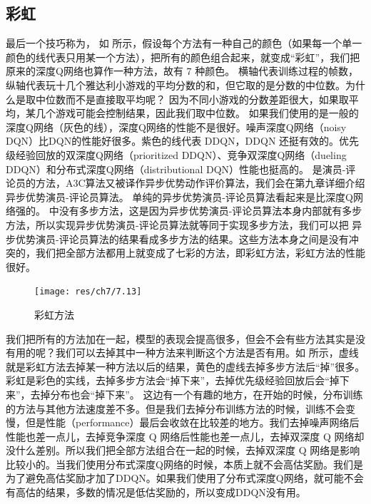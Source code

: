 \subsection{彩虹} 

最后一个技巧称为，
如 所示，假设每个方法有一种自己的颜色（如果每一个单一颜色的线代表只用某一个方法），把所有的颜色组合起来，就变成“彩虹”，我们把原来的深度Q网络也算作一种方法，故有 7 种颜色。
横轴代表训练过程的帧数，纵轴代表玩十几个雅达利小游戏的平均分数的和，但它取的是分数的中位数。为什么是取中位数而不是直接取平均呢？
因为不同小游戏的分数差距很大，如果取平均，某几个游戏可能会控制结果，因此我们取中位数。
如果我们使用的是一般的深度Q网络（灰色的线），深度Q网络的性能不是很好。噪声深度Q网络（noisy DQN）比DQN的性能好很多。紫色的线代表 DDQN，DDQN 还挺有效的。优先级经验回放的双深度Q网络（prioritized DDQN）、竞争双深度Q网络（dueling DDQN）和分布式深度Q网络（distributional DQN）性能也挺高的。
是演员-评论员的方法，A3C算法又被译作异步优势动作评价算法，我们会在第九章详细介绍异步优势演员-评论员算法。
单纯的异步优势演员-评论员算法看起来是比深度Q网络强的。 中没有多步方法，这是因为异步优势演员-评论员算法本身内部就有多步方法，所以实现异步优势演员-评论员算法就等同于实现多步方法，我们可以把 异步优势演员-评论员算法的结果看成多步方法的结果。这些方法本身之间是没有冲突的，我们把全部方法都用上就变成了七彩的方法，即彩虹方法，彩虹方法的性能很好。

\begin{figure}[htb]
    \centering
    \texttt{[image: res/ch7/7.13]}
    \caption{彩虹方法}
    \label{fig:rainbow}
\end{figure}

我们把所有的方法加在一起，模型的表现会提高很多，但会不会有些方法其实是没有用的呢？我们可以去掉其中一种方法来判断这个方法是否有用。如 所示，虚线就是彩虹方法去掉某一种方法以后的结果，黄色的虚线去掉多步方法后“掉”很多。彩虹是彩色的实线，去掉多步方法会“掉下来”，去掉优先级经验回放后会“掉下来”，去掉分布也会“掉下来”。
这边有一个有趣的地方，在开始的时候，分布训练的方法与其他方法速度差不多。但是我们去掉分布训练方法的时候，训练不会变慢，但是性能（performance）最后会收敛在比较差的地方。我们去掉噪声网络后性能也差一点儿，去掉竞争深度 Q 网络后性能也差一点儿，去掉双深度 Q 网络却没什么差别。所以我们把全部方法组合在一起的时候，去掉双深度 Q 网络是影响比较小的。当我们使用分布式深度Q网络的时候，本质上就不会高估奖励。我们是为了避免高估奖励才加了DDQN。如果我们使用了分布式深度Q网络，就可能不会有高估的结果，多数的情况是低估奖励的，所以变成DDQN没有用。

